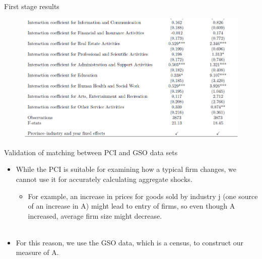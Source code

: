 \documentclass{beamer}
\begin{document}
\begin{frame}{First stage results}

\begin{figure}
\centering
\includegraphics[width=1\linewidth]{9-2.png}
\end{figure}

\end{frame}

\begin{frame}{Validation of matching between PCI and GSO data sets}

\begin{itemize}
\item While the PCI is suitable for examining how a typical firm changes, we cannot use it for accurately calculating aggregate shocks.
\begin{itemize}
\item For example, an increase in prices for goods sold by industry j (one source of an increase in A) might
lead to entry of firms, so even though A increased, average firm size might decrease. \\~
\end{itemize}

\item For this reason, we use the GSO data, which is a census, to construct our measure of A.

\end{itemize}

\end{frame}
\end{document}

